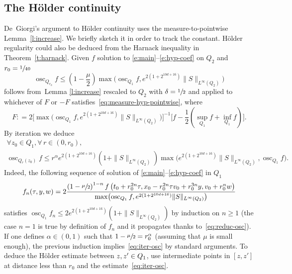 \documentclass[10pt]{amsart}
\DeclareMathOperator{\osc}{osc}
\theoremstyle{definition}
\theoremstyle{remark}
\begin{document}
\subsection{The Hölder continuity}
\label{ss:Holder}

De~Giorgi's argument to Hölder continuity uses the
measure-to-pointwise Lemma~\ref{l:increase}. We briefly sketch it
in order to track the constant. Hölder regularity could also be
deduced from the Harnack inequality in
Theorem~\ref{t:harnack}. Given $f$ solution to
\eqref{e:main}--\eqref{e:hyp-coef} on $Q_2$ and
$r_0 =\sfrac{1}{40}$
\begin{equation}
\label{eq:reduc-osc}
\osc_{Q_{r_0}}f \leq \left( 1- \frac{\mu}{2} \right)
\max\bigl(\osc_{Q_{1}}f,e^{2(1+2^{10d+16})} \|S\|_{L^{\infty}(Q_2)}\bigr)
\end{equation}
follows from~Lemma \ref{l:increase} rescaled to $Q_2$ with
$\delta=\sfrac12$ and applied to whichever of $F$ or $-F$
satisfies~\eqref{eq:measure-hyp-pointwise}, where
\[\textstyle
F : =2 \bigl[\max\bigl(\osc_{Q_{1}} f,
e^{2(1+2^{10d+16})}\|S\|_{L^{\infty}(Q_2)} \bigr) \bigr]^{-1} \bigl[f-\frac12
(\sup_{Q_{1}} f+\inf_{Q_{1}} f)\bigr].
\]
By iteration we deduce
\begin{multline}
\label{eq:iter-osc}
\forall z_0 \in Q_{1}, \forall \, r\in(0,r_0),\\
\osc_{Q_{r}(z_0)}f
\leq r^{\alpha} e^{2(1+2^{10d+16})}
\left(1+\|S\|_{L^{\infty}(Q_2)}\right) \max\bigl(e^{2(1+2^{10d+16})}
\|S\|_{L^{\infty}(Q_2)},\osc_{Q_1}f \bigr).
\end{multline}
Indeed, the following sequence of solution of
\eqref{e:main}--\eqref{e:hyp-coef} in $Q_1$
\begin{align*}
f_{n}(\tau,y,w)= 2
\frac{\left( 1 - \sfrac{\mu}{2}
\right)^{1-n} f\left(t_0+ r_0^{2n} \tau, x_0
-r_0^{2n} \tau v_0 + r_0^{3n} y,v_0+ r_0
^n w \right)}{\max \bigl(\osc_{Q_{1}}f, e^{2(1+2^{10d+16})}
\|S\|_{L^{\infty}(Q_2)} \bigr)}
\end{align*}
satisfies
$\osc_{Q_{1}}f_{n} \leq 2
e^{2(1+2^{10d+16})}(1+\|S\|_{L^{\infty}(Q_2)})$ by induction on
$n \!\ge\! 1$ (the case $n\!=\!1$ is true by definition of $f_n$ and it
propagates thanks to~\eqref{eq:reduc-osc}). If one defines
$\alpha\in (0,1)$ such that $1-\sfrac{\mu}{2}=r_0^{\alpha}$
(assuming that $\mu$ is small enough), the previous induction
implies~\eqref{eq:iter-osc} by standard arguments. To deduce the
Hölder estimate between $z,z'\in\nobreak Q_1$, use intermediate
points in $[z,z']$ at distance less than $r_0$ and the
estimate~\eqref{eq:iter-osc}.
\end{document}
